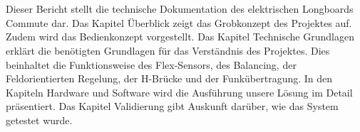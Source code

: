 \\ \\
Dieser Bericht stellt die technische Dokumentation des elektrischen Longboards Commute dar. Das Kapitel Überblick zeigt das Grobkonzept des Projektes auf. Zudem wird das Bedienkonzept vorgestellt. Das Kapitel Technische Grundlagen erklärt die benötigten Grundlagen für das Verständnis des Projektes. Dies beinhaltet die Funktionsweise des Flex-Sensors, des Balancing, der Feldorientierten Regelung, der H-Brücke und der Funkübertragung. In den Kapiteln Hardware und Software wird die Ausführung unsere Lösung im Detail präsentiert. Das Kapitel Validierung gibt Auskunft darüber, wie das System getestet wurde. 
